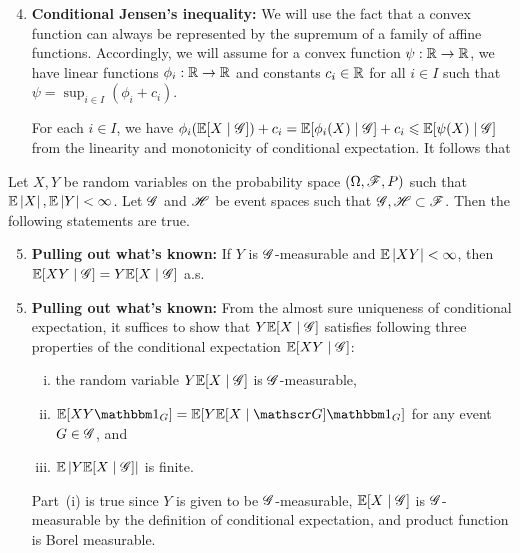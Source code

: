 \documentclass[12pt,aspectratio=169]{beamer}
\begin{document}
\begin{frame}
\begin{Proof}
\begin{enumerate}
\setcounter{enumi}{3}
\item \textbf{Conditional Jensen's inequality:}
We will use the fact that a convex function can always be represented by the supremum of a family of affine functions. 
Accordingly, we will assume for a convex function $\psi:\mathbb{R}\to\mathbb{R}$, 
we have linear functions $\phi_i:\mathbb{R}\to\mathbb{R}$ and constants $c_i\in\mathbb{R}$ for all $i \in I$ such that $\psi = \sup_{i\in I}(\phi_i+c_i)$. 

For each $i\in I$, we have $\phi_i(\mathbb{E}[X\mid\mathscr{G}])+c_i = \mathbb{E}[\phi_i(X)\mid\mathscr{G}] +c_i\leqslant \mathbb{E}[\psi(X)\mid\mathscr{G}]$ from the linearity and monotonicity of conditional expectation. 
It follows that
\end{enumerate}
\end{Proof}
\end{frame}


\begin{frame}
\begin{prop} 
Let $X,Y$ be random variables on the probability space $(\Omega, \mathscr{F}, P)$ such that $\mathbb{E}\left\lvert X\right\rvert , \mathbb{E}\left\lvert Y\right\rvert < \infty$. 
Let $\mathscr{G}$ and $\mathscr{H}$ be event spaces such that $\mathscr{G}, \mathscr{H} \subset \mathscr{F}$. 
Then the following statements are true. 
\begin{enumerate}
\setcounter{enumi}{4}
\item \textbf{Pulling out what's known:} If $Y$ is $\mathscr{G}$-measurable and $\mathbb{E}\left\lvert XY\right\rvert <\infty$, then
$\mathbb{E}[XY\mid \mathscr{G}] = Y\mathbb{E}[X\mid\mathscr{G}]$ a.s.
\end{enumerate}
\end{prop}
\end{frame}


\begin{frame}
\begin{Proof}
\begin{enumerate}
\setcounter{enumi}{4}
\item \textbf{Pulling out what's known:} 
From the almost sure uniqueness of conditional expectation,  
it suffices to show that $Y\mathbb{E}[X\mid\mathscr{G}]$ satisfies following three properties of the conditional expectation $\mathbb{E}[XY\mid\mathscr{G}]$: 
\begin{enumerate}[(i)]
\item the random variable $Y\mathbb{E}[X\mid\mathscr{G}]$ is $\mathscr{G}$-measurable,
\item $\E[XY\Ind{G}] = \E[Y\E[X\mid\sG]\Ind{G}]$ for any event $G\in\mathscr{G}$, and 
\item $\mathbb{E}\left\lvert Y\mathbb{E}[X\mid\mathscr{G}]\right\rvert$ is finite.
\end{enumerate}
Part~(i) is true since $Y$ is given to be $\mathscr{G}$-measurable, 
$\mathbb{E}[X\mid\mathscr{G}]$ is $\mathscr{G}$-measurable by the definition of conditional expectation, 
and product function is Borel measurable.
\end{enumerate}
\end{Proof}
\end{frame}
\end{document}
